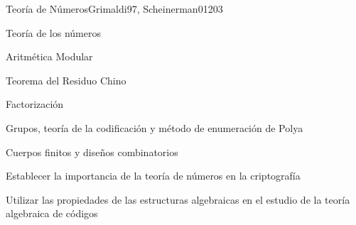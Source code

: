 \begin{syllabus}
\begin{unit}{Teoría de Números}{}{Grimaldi97, Scheinerman01}{20}{3}
   \begin{topics}
      \item Teoría de los números
      \item Aritmética  Modular
      \item Teorema del Residuo Chino
      \item Factorización
      \item Grupos, teoría de la codificación y método de enumeración de Polya
      \item Cuerpos finitos y diseños combinatorios
   \end{topics}

   \begin{learningoutcomes}
      \item Establecer la importancia de la teoría de números en la criptografía
      \item Utilizar las propiedades de las estructuras algebraicas en el estudio de la teoría algebraica de códigos
   \end{learningoutcomes}
\end{unit}

\begin{coursebibliography}
\end{coursebibliography}

\end{syllabus}

%

